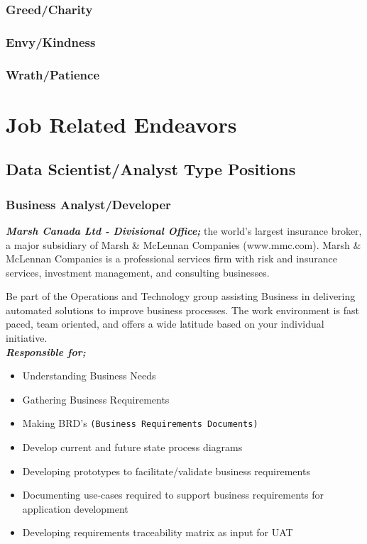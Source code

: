 \documentclass{article}
\begin{document}
\subsubsection{Greed/Charity}

\subsubsection{Envy/Kindness}

\subsubsection{Wrath/Patience}

\newpage 








\section{Job Related Endeavors}

\subsection{Data Scientist/Analyst Type Positions}

\subsubsection{Business Analyst/Developer}

\textbf{\textit{Marsh Canada Ltd - Divisional Office;}} the world's largest insurance broker, a major subsidiary of Marsh & McLennan Companies (www.mmc.com). Marsh & McLennan Companies is a professional services firm with risk and insurance services, investment management, and consulting businesses. 

Be part of the Operations and Technology group assisting Business in delivering automated solutions to improve business processes. The work environment is fast paced, team oriented, and offers a wide latitude based on your individual initiative. \\

\hspace{-0.67cm} \textbf{\textit{Responsible for;}}

\begin{itemize}
    \item Understanding Business Needs
    \item Gathering Business Requirements
    \item Making BRD's \texttt{(Business Requirements Documents)}
    \item Develop current and future state process diagrams
    \item Developing prototypes to facilitate/validate business requirements
    \item Documenting use-cases required to support business requirements for application development
    \item Developing requirements traceability matrix as input for UAT
\end{itemize}
\end{document}
